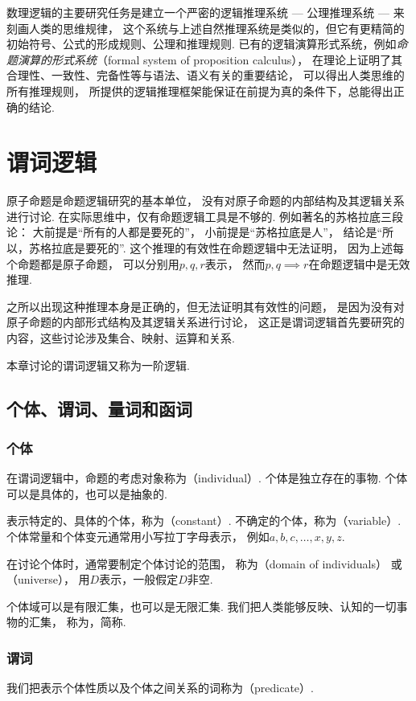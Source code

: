 数理逻辑的主要研究任务是建立一个严密的逻辑推理系统 --- 公理推理系统 --- 来刻画人类的思维规律，
这个系统与上述自然推理系统是类似的，但它有更精简的初始符号、公式的形成规则、公理和推理规则.
已有的逻辑演算形式系统，例如\emph{命题演算的形式系统}（formal system of proposition calculus），
在理论上证明了其合理性、一致性、完备性等与语法、语义有关的重要结论，
可以得出人类思维的所有推理规则，
所提供的逻辑推理框架能保证在前提为真的条件下，总能得出正确的结论.

\chapter{谓词逻辑}
原子命题是命题逻辑研究的基本单位，
没有对原子命题的内部结构及其逻辑关系进行讨论.
在实际思维中，仅有命题逻辑工具是不够的.
例如著名的苏格拉底三段论：
大前提是“所有的人都是要死的”，
小前提是“苏格拉底是人”，
结论是“所以，苏格拉底是要死的”.
这个推理的有效性在命题逻辑中无法证明，
因为上述每个命题都是原子命题，
可以分别用\(p,q,r\)表示，
然而\(p,q \implies r\)在命题逻辑中是无效推理.

之所以出现这种推理本身是正确的，但无法证明其有效性的问题，
是因为没有对原子命题的内部形式结构及其逻辑关系进行讨论，
这正是谓词逻辑首先要研究的内容，这些讨论涉及集合、映射、运算和关系.

本章讨论的谓词逻辑又称为一阶逻辑.

\section{个体、谓词、量词和函词}
\subsection{个体}
在谓词逻辑中，命题的考虑对象称为（individual）.
个体是独立存在的事物.
个体可以是具体的，也可以是抽象的.

表示特定的、具体的个体，称为（constant）.
不确定的个体，称为（variable）.
个体常量和个体变元通常用小写拉丁字母表示，
例如\(a,b,c,\dotsc,x,y,z\).

在讨论个体时，通常要制定个体讨论的范围，
称为（domain of individuals）
或（universe），
用\(D\)表示，一般假定\(D\)非空.

个体域可以是有限汇集，也可以是无限汇集.
我们把人类能够反映、认知的一切事物的汇集，
称为，简称.

\subsection{谓词}
我们把表示个体性质以及个体之间关系的词称为（predicate）.

